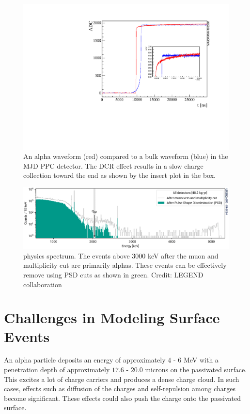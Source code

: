 \begin{figure}[!htb]
\centering
\includegraphics[width=0.9\linewidth]{ch3/figs/dcr_waveform.pdf}
\caption{An alpha waveform (red) compared to a bulk waveform (blue) in the MJD PPC detector. The DCR effect results in a slow charge collection toward the end as shown by the insert plot in the box.\cite{TUBE_paper}}
\label{fig:dcr_waveform}
\end{figure}

\begin{figure}[!htb]
\centering
  \includegraphics[width=0.99\linewidth]{ch3/figs/l200-phy-spectrum-psd.png}
  \caption{{\Ltwo} physics spectrum. The events above 3000 keV after the muon and multiplicity cut are primarily alphas. These events can be effectively remove using PSD cuts as shown in green. Credit: LEGEND collaboration}
\label{ch3_fig_L200_surface_background}
\end{figure}


\section{Challenges in Modeling Surface Events}
An alpha particle deposits an energy of approximately $4$ - $6$ MeV with a penetration depth of approximately $17.6$ - $20.0$ microns on the passivated surface. This excites a lot of charge carriers and produces a dense charge cloud. In such cases, effects such as diffusion of the charges and self-repulsion among charges become significant. These effects could also push the charge onto the passivated surface. 

